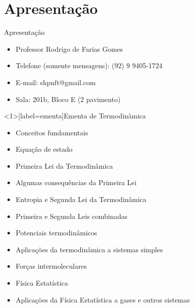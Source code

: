 \documentclass[t,%
brazilian,%
11pt,%
aspectratio=169,%
table%
]{beamer}
\title{\Disciplina}
\author{\Professor}
\date{\Periodo}
\newcommand{\esimo}{\textordmasculine }
\def\Disciplina{Termodinâmica}
\begin{document}
\section{Apresentação}

\begin{frame} %
    \titlepage
\end{frame}

\begin{frame}{Apresentação}
    \begin{itemize}
        \item Professor {\selectfont Rodrigo de Farias Gomes}
        \item Telefone (somente mensagens): (92) 9 9405-1724
        \item E-mail: shpnft@gmail.com
        \item Sala: 201b, Bloco E (2\esimo{} pavimento)
    \end{itemize}

\end{frame}

\begin{frame}<1>[label=ementa]{Ementa de \Disciplina}
    \begin{itemize}
        \item Conceitos fundamentais
        \item Equação de estado
        \item Primeira Lei da Termodinâmica
        \item Algumas consequências da Primeira Lei
        \item Entropia e Segunda Lei da Termodinâmica
        \item Primeira e Segunda Leis combinadas
        \item Potenciais termodinâmicos
        \item Aplicações da termodinâmica a sistemas simples
        \item Forças intermoleculares
        \item \alert<2->{Física Estatística}
        \item \alert<2->{Aplicações da Física Estatística a gases e outros sistemas}
    \end{itemize}
\end{frame}
\end{document}
